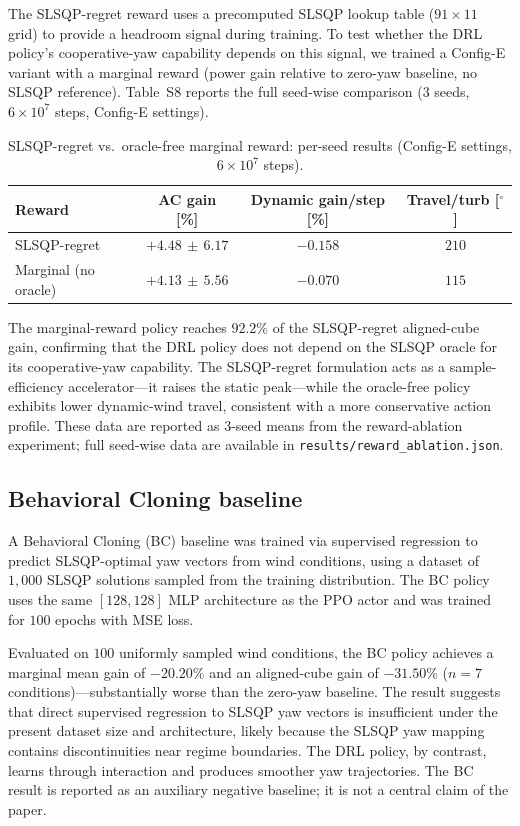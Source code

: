 \documentclass{article}
\begin{document}
The SLSQP-regret reward uses a precomputed SLSQP lookup table ($91{\times}11$ grid) to provide a headroom signal during training. To test whether the DRL policy's cooperative-yaw capability depends on this signal, we trained a Config-E variant with a marginal reward (power gain relative to zero-yaw baseline, no SLSQP reference). Table~S8 reports the full seed-wise comparison (3 seeds, $6{\times}10^{7}$ steps, Config-E settings).

\begin{table}[h]
\centering
\caption{SLSQP-regret vs.\ oracle-free marginal reward: per-seed results (Config-E settings, $6{\times}10^{7}$ steps).}
\label{tab:reward_abl}
\small
\begin{tabular}{lccc}
\toprule
Reward & AC gain [\%] & Dynamic gain/step [\%] & Travel/turb [$^\circ$] \\
\midrule
SLSQP-regret & $+4.48\,\pm\,6.17$ & $-0.158$ & $210$ \\
Marginal (no oracle) & $+4.13\,\pm\,5.56$ & $-0.070$ & $115$ \\
\bottomrule
\end{tabular}
\end{table}

The marginal-reward policy reaches $92.2\%$ of the SLSQP-regret aligned-cube gain, confirming that the DRL policy does not depend on the SLSQP oracle for its cooperative-yaw capability. The SLSQP-regret formulation acts as a sample-efficiency accelerator---it raises the static peak---while the oracle-free policy exhibits lower dynamic-wind travel, consistent with a more conservative action profile. These data are reported as 3-seed means from the reward-ablation experiment; full seed-wise data are available in \texttt{results/reward\_ablation.json}.

\subsection{Behavioral Cloning baseline}

A Behavioral Cloning (BC) baseline was trained via supervised regression to predict SLSQP-optimal yaw vectors from wind conditions, using a dataset of $1{,}000$ SLSQP solutions sampled from the training distribution. The BC policy uses the same $[128,128]$ MLP architecture as the PPO actor and was trained for $100$ epochs with MSE loss.

Evaluated on $100$ uniformly sampled wind conditions, the BC policy achieves a marginal mean gain of $-20.20\%$ and an aligned-cube gain of $-31.50\%$ ($n{=}7$ conditions)---substantially worse than the zero-yaw baseline. The result suggests that direct supervised regression to SLSQP yaw vectors is insufficient under the present dataset size and architecture, likely because the SLSQP yaw mapping contains discontinuities near regime boundaries. The DRL policy, by contrast, learns through interaction and produces smoother yaw trajectories. The BC result is reported as an auxiliary negative baseline; it is not a central claim of the paper.
\end{document}
